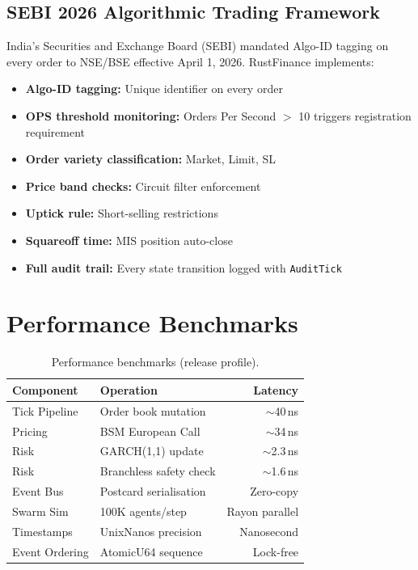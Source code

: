 \documentclass[11pt]{article}
\theoremstyle{definition}
\begin{document}
\subsection{SEBI 2026 Algorithmic Trading Framework}

India's Securities and Exchange Board (SEBI) mandated
Algo-ID tagging on every order to NSE/BSE effective
April 1, 2026. RustFinance implements:
\begin{itemize}[leftmargin=*,topsep=2pt,itemsep=1pt]
  \item \textbf{Algo-ID tagging:} Unique identifier on every order
  \item \textbf{OPS threshold monitoring:} Orders Per Second $>$ 10
        triggers registration requirement
  \item \textbf{Order variety classification:} Market, Limit, SL
  \item \textbf{Price band checks:} Circuit filter enforcement
  \item \textbf{Uptick rule:} Short-selling restrictions
  \item \textbf{Squareoff time:} MIS position auto-close
  \item \textbf{Full audit trail:} Every state transition logged
        with \texttt{AuditTick}
\end{itemize}

\section{Performance Benchmarks}
\label{sec:bench}

\begin{table}[H]
\centering
\caption{Performance benchmarks (release profile).}
\label{tab:bench}
\small
\begin{tabular}{@{}llr@{}}
\toprule
\textbf{Component} & \textbf{Operation} & \textbf{Latency} \\
\midrule
Tick Pipeline       & Order book mutation    & $\sim$40\,ns \\
Pricing             & BSM European Call      & $\sim$34\,ns \\
Risk                & GARCH(1,1) update      & $\sim$2.3\,ns \\
Risk                & Branchless safety check & $\sim$1.6\,ns \\
Event Bus           & Postcard serialisation & Zero-copy \\
Swarm Sim           & 100K agents/step       & Rayon parallel \\
Timestamps          & UnixNanos precision    & Nanosecond \\
Event Ordering      & AtomicU64 sequence     & Lock-free \\
\bottomrule
\end{tabular}
\end{table}
\end{document}
